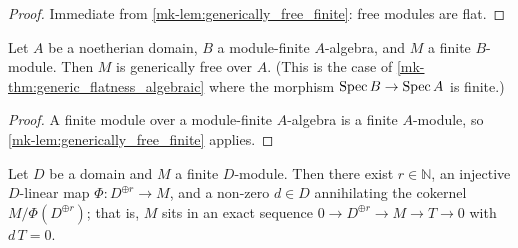 \begin{proof}
  \leanok
{}
  Immediate from \ref{mk-lem:generically_free_finite}: free modules are flat.
\end{proof}

\begin{lemma}\label{mk-lem:generically_free_module_finite}
  \leanok

  Let \(A\) be a noetherian domain, \(B\) a module-finite \(A\)-algebra, and
  \(M\) a finite \(B\)-module.  Then \(M\) is generically free over \(A\).
  (This is the case of \ref{mk-thm:generic_flatness_algebraic} where the
  morphism \(\operatorname{Spec} B \to \operatorname{Spec} A\) is finite.)
\end{lemma}

\begin{proof}
  \leanok
{}
  A finite module over a module-finite \(A\)-algebra is a finite
  \(A\)-module, so \ref{mk-lem:generically_free_finite} applies.
\end{proof}

\begin{lemma}\label{mk-lem:generic_rank_comparison}
  \leanok

  Let \(D\) be a domain and \(M\) a finite \(D\)-module.  Then there exist
  \(r \in \mathbb{N}\), an injective \(D\)-linear map
  \(\Phi : D^{\oplus r} \to M\),
  and a non-zero \(d \in D\) annihilating the cokernel
  \(M / \Phi(D^{\oplus r})\); that is, \(M\) sits in an exact sequence
  \(0 \to D^{\oplus r} \to M \to T \to 0\) with \(d\,T = 0\).
\end{lemma}

